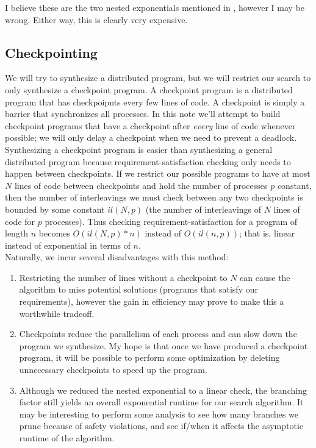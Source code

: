 \documentclass[12pt]{article}
\begin{document}
	I believe these are the two nested exponentials mentioned in \cite{asdp}, however I may be wrong.  Either way, this is clearly very expensive.  

\subsection{Checkpointing}
	We will try to synthesize a distributed program, but we will restrict our search to only synthesize a checkpoint program.  A checkpoint program is a distributed program that has checkpoipnts every few lines of code.  A checkpoint is simply a barrier that synchronizes all processes.  In this note we'll attempt to build checkpoint programs that have a checkpoint after \textit{every} line of code whenever possible; we will only delay a checkpoint when we need to prevent a deadlock.  Synthesizing a checkpoint program is easier than synthesizing a general distributed program because requirement-satisfaction checking only needs to happen between checkpoints.  If we restrict our possible programs to have at most $N$ lines of code between checkpoints and hold the number of processes $p$ constant, then the number of interleavings we must check between any two checkpoints is bounded by some constant $il(N,p)$ (the number of interleavings of $N$ lines of code for $p$ processes).  Thus checking requirement-satisfaction for a program of length $n$ becomes $O(il(N,p)*n)$ instead of $O(il(n,p))$; that is, linear instead of exponential in terms of $n$.  \\

	Naturally, we incur several disadvantages with this method:
	\begin{enumerate}
		\item Restricting the number of lines without a checkpoint to $N$ can cause the algorithm to miss potential solutions (programs that satisfy our requirements), however the gain in efficiency may prove to make this a worthwhile tradeoff.  
		\item Checkpoints reduce the parallelism of each process and can slow down the program we synthesize.  My hope is that once we have produced a checkpoint program, it will be possible to perform some optimization by deleting unnecessary checkpoints to speed up the program.  
		\item Although we reduced the nested exponential to a linear check, the branching factor still yields an overall exponential runtime for our search algorithm.  It may be interesting to perform some analysis to see how many branches we prune because of safety violations, and see if/when it affects the asymptotic runtime of the algorithm.  
	\end{enumerate}
\end{document}
